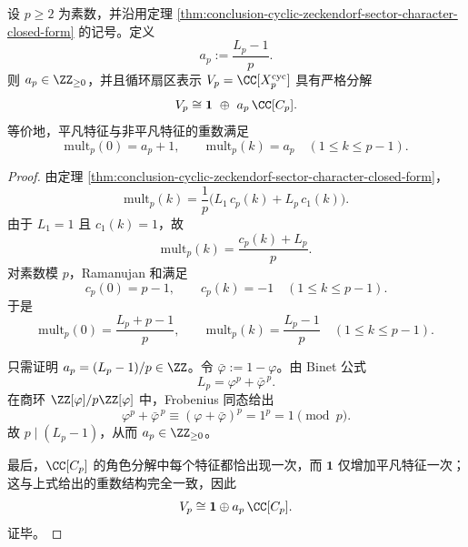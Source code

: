 \begin{theorem}\label{thm:conclusion-cyclic-zeckendorf-prime-regular-bias}
设 \(p\ge 2\) 为素数，并沿用定理 \ref{thm:conclusion-cyclic-zeckendorf-sector-character-closed-form} 的记号。定义
\[
a_p:=\frac{L_p-1}{p}.
\]
则 \(a_p\in\ZZ_{\ge 0}\)，并且循环扇区表示 \(V_p=\CC[X_p^{\mathrm{cyc}}]\) 具有严格分解
\[
V_p\cong \mathbf 1\ \oplus\ a_p\,\CC[C_p].
\]
等价地，平凡特征与非平凡特征的重数满足
\[
\mathrm{mult}_p(0)=a_p+1,
\qquad
\mathrm{mult}_p(k)=a_p\quad (1\le k\le p-1).
\]
\end{theorem}
\begin{proof}
由定理 \ref{thm:conclusion-cyclic-zeckendorf-sector-character-closed-form}，
\[
\mathrm{mult}_p(k)=\frac1p\bigl(L_1\,c_p(k)+L_p\,c_1(k)\bigr).
\]
由于 \(L_1=1\) 且 \(c_1(k)=1\)，故
\[
\mathrm{mult}_p(k)=\frac{c_p(k)+L_p}{p}.
\]
对素数模 \(p\)，Ramanujan 和满足
\[
c_p(0)=p-1,
\qquad
c_p(k)=-1\quad (1\le k\le p-1).
\]
于是
\[
\mathrm{mult}_p(0)=\frac{L_p+p-1}{p},
\qquad
\mathrm{mult}_p(k)=\frac{L_p-1}{p}\quad (1\le k\le p-1).
\]

只需证明 \(a_p=(L_p-1)/p\in\ZZ\)。令 \(\bar\varphi:=1-\varphi\)。由 Binet 公式
\[
L_p=\varphi^p+\bar\varphi^{\,p}.
\]
在商环 \(\ZZ[\varphi]/p\ZZ[\varphi]\) 中，Frobenius 同态给出
\[
\varphi^p+\bar\varphi^{\,p}\equiv (\varphi+\bar\varphi)^p=1^p=1\pmod p.
\]
故 \(p\mid(L_p-1)\)，从而 \(a_p\in\ZZ_{\ge 0}\)。

最后，\(\CC[C_p]\) 的角色分解中每个特征都恰出现一次，而 \(\mathbf 1\) 仅增加平凡特征一次；这与上式给出的重数结构完全一致，因此
\[
V_p\cong \mathbf 1\oplus a_p\,\CC[C_p].
\]
证毕。
\end{proof}

